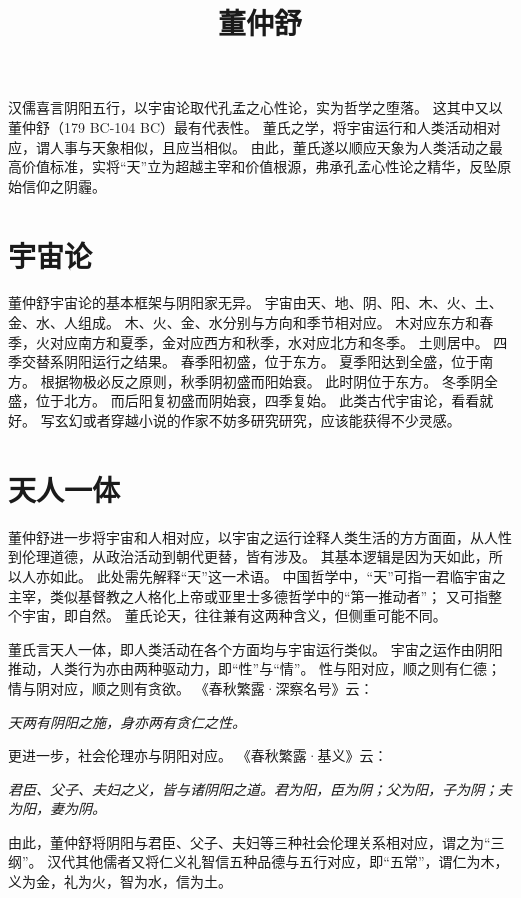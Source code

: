\documentclass[11pt]{article}
\title{董仲舒}
\date{}
\begin{document}
  \maketitle

  \linenumbers 
汉儒喜言阴阳五行，以宇宙论取代孔孟之心性论，实为哲学之堕落。
这其中又以董仲舒（179 BC-104 BC）最有代表性。
董氏之学，将宇宙运行和人类活动相对应，谓人事与天象相似，且应当相似。
由此，董氏遂以顺应天象为人类活动之最高价值标准，实将“天”立为超越主宰和价值根源，弗承孔孟心性论之精华，反坠原始信仰之阴霾。

\section{宇宙论}
董仲舒宇宙论的基本框架与阴阳家无异。
宇宙由天、地、阴、阳、木、火、土、金、水、人组成。
木、火、金、水分别与方向和季节相对应。
木对应东方和春季，火对应南方和夏季，金对应西方和秋季，水对应北方和冬季。
土则居中。
四季交替系阴阳运行之结果。
春季阳初盛，位于东方。
夏季阳达到全盛，位于南方。
根据物极必反之原则，秋季阴初盛而阳始衰。
此时阴位于东方。
冬季阴全盛，位于北方。
而后阳复初盛而阴始衰，四季复始。
此类古代宇宙论，看看就好。
写玄幻或者穿越小说的作家不妨多研究研究，应该能获得不少灵感。

\section{天人一体}
董仲舒进一步将宇宙和人相对应，以宇宙之运行诠释人类生活的方方面面，从人性到伦理道德，从政治活动到朝代更替，皆有涉及。
其基本逻辑是因为天如此，所以人亦如此。
此处需先解释“天”这一术语。
中国哲学中，“天”可指一君临宇宙之主宰，类似基督教之人格化上帝或亚里士多德哲学中的“第一推动者”；
又可指整个宇宙，即自然。
董氏论天，往往兼有这两种含义，但侧重可能不同。

\newline

董氏言天人一体，即人类活动在各个方面均与宇宙运行类似。
宇宙之运作由阴阳推动，人类行为亦由两种驱动力，即“性”与“情”。
性与阳对应，顺之则有仁德；
情与阴对应，顺之则有贪欲。
《春秋繁露·深察名号》云：

\textit{天两有阴阳之施，身亦两有贪仁之性。}

更进一步，社会伦理亦与阴阳对应。
《春秋繁露·基义》云：

\textit{君臣、父子、夫妇之义，皆与诸阴阳之道。君为阳，臣为阴；父为阳，子为阴；夫为阳，妻为阴。}

由此，董仲舒将阴阳与君臣、父子、夫妇等三种社会伦理关系相对应，谓之为“三纲”。
汉代其他儒者又将仁义礼智信五种品德与五行对应，即“五常”，谓仁为木，义为金，礼为火，智为水，信为土。
\end{document}
